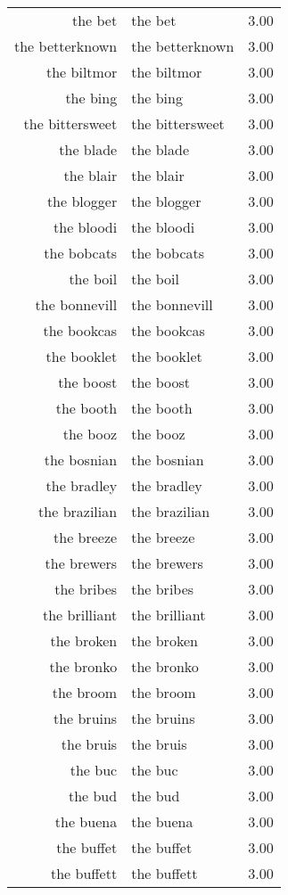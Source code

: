 \begin{table}[ht]
\begin{tabular}{rlr}
  the bet & the bet & 3.00 \\ 
  the betterknown & the betterknown & 3.00 \\ 
  the biltmor & the biltmor & 3.00 \\ 
  the bing & the bing & 3.00 \\ 
  the bittersweet & the bittersweet & 3.00 \\ 
  the blade & the blade & 3.00 \\ 
  the blair & the blair & 3.00 \\ 
  the blogger & the blogger & 3.00 \\ 
  the bloodi & the bloodi & 3.00 \\ 
  the bobcats & the bobcats & 3.00 \\ 
  the boil & the boil & 3.00 \\ 
  the bonnevill & the bonnevill & 3.00 \\ 
  the bookcas & the bookcas & 3.00 \\ 
  the booklet & the booklet & 3.00 \\ 
  the boost & the boost & 3.00 \\ 
  the booth & the booth & 3.00 \\ 
  the booz & the booz & 3.00 \\ 
  the bosnian & the bosnian & 3.00 \\ 
  the bradley & the bradley & 3.00 \\ 
  the brazilian & the brazilian & 3.00 \\ 
  the breeze & the breeze & 3.00 \\ 
  the brewers & the brewers & 3.00 \\ 
  the bribes & the bribes & 3.00 \\ 
  the brilliant & the brilliant & 3.00 \\ 
  the broken & the broken & 3.00 \\ 
  the bronko & the bronko & 3.00 \\ 
  the broom & the broom & 3.00 \\ 
  the bruins & the bruins & 3.00 \\ 
  the bruis & the bruis & 3.00 \\ 
  the buc & the buc & 3.00 \\ 
  the bud & the bud & 3.00 \\ 
  the buena & the buena & 3.00 \\ 
  the buffet & the buffet & 3.00 \\ 
  the buffett & the buffett & 3.00 \\ 

\end{tabular}
\end{table}
